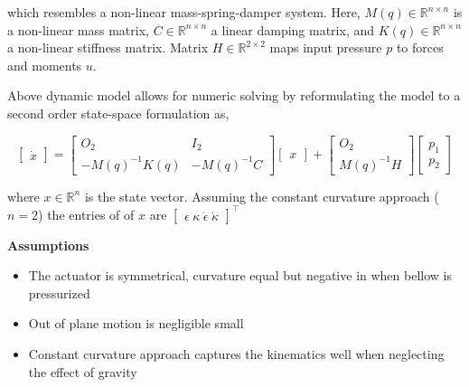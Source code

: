 which resembles a non-linear mass-spring-damper system. Here, $M(q)  \in \mathbb{R}^{n\times n}$ is a non-linear mass matrix, $C   \in \mathbb{R}^{n\times n}$ a linear damping matrix, and $K(q)   \in \mathbb{R}^{n\times n}$ a non-linear stiffness matrix. Matrix $H   \in \mathbb{R}^{2\times 2}$ maps input pressure $p$ to forces and moments $u$.

Above dynamic model allows for numeric solving by reformulating the model to a second order state-space formulation as,

\begin{equation}
     \begin{bmatrix} \dot{x}  \end{bmatrix}   =      \begin{bmatrix} O_2 & I_2 \\ -M(q)^{-1}K(q)  & -M(q)^{-1} C \end{bmatrix}      \begin{bmatrix} x \end{bmatrix}  +      \begin{bmatrix} O_2 \\ M(q)^{-1}H   \end{bmatrix}       \begin{bmatrix} p_1\\ p_2   \end{bmatrix} 
\end{equation}

where $x \in \mathbb{R}^{n}$ is the state vector. Assuming the constant curvature approach ($n = 2$) the entries of of $x$ are $ \begin{bmatrix} \epsilon \hspace{3pt} \kappa \hspace{3pt} \dot{\epsilon}  \hspace{3pt} \dot{\kappa}  \end{bmatrix}^{\top}  $










\textbf{Assumptions}
\begin{itemize}
    \item The actuator is symmetrical, curvature equal but negative in when bellow is pressurized
    \item Out of plane motion is negligible small
    \item Constant curvature approach captures the kinematics well when neglecting the effect of gravity 
\end{itemize}
